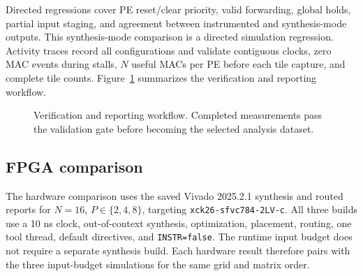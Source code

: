 \documentclass[conference]{IEEEtran}
\begin{document}
Directed regressions cover PE reset/clear priority, valid forwarding, global holds, partial input staging, and agreement between instrumented and synthesis-mode outputs. This synthesis-mode comparison is a directed simulation regression. Activity traces record all configurations and validate contiguous clocks, zero MAC events during stalls, $N$ useful MACs per PE before each tile capture, and complete tile counts. Figure~\ref{fig:verify} summarizes the verification and reporting workflow.

\begin{figure}[t]
\centering
{}
\caption{Verification and reporting workflow. Completed measurements pass the validation gate before becoming the selected analysis dataset.}
\label{fig:verify}
\end{figure}

\subsection{FPGA comparison}
The hardware comparison uses the saved Vivado 2025.2.1 synthesis and routed reports for $N=16$, $P\in\{2,4,8\}$, targeting \texttt{xck26-sfvc784-2LV-c}. All three builds use a 10 ns clock, out-of-context synthesis, optimization, placement, routing, one tool thread, default directives, and \texttt{INSTR=false}. The runtime input budget does not require a separate synthesis build. Each hardware result therefore pairs with the three input-budget simulations for the same grid and matrix order.
\end{document}
